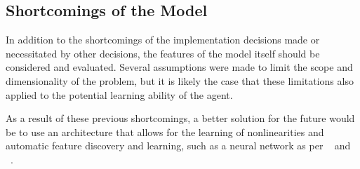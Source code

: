 
\subsection{Shortcomings of the Model}
\label{sec:disc-shortcomings}

In addition to the shortcomings of the implementation decisions made or
necessitated by other decisions,
the features of the model itself should be considered and evaluated.
%
Several assumptions were made to limit the scope and dimensionality of the
problem,
but it is likely the case that these limitations also applied to the potential
learning ability of the agent.






As a result of these previous shortcomings,
a better solution for the future would be to use an architecture that allows
for the learning of nonlinearities and automatic feature discovery and
learning,
such as a neural network
as per ~\cite{deepmind_alphago} and ~\cite{tdgammon}.

